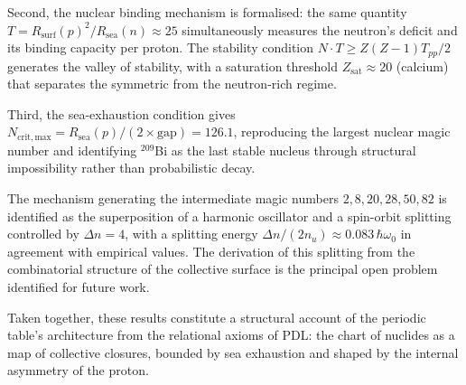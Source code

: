 \documentclass[11pt,a4paper]{article}
\theoremstyle{definition}
\newcommand{\PDL}{\textnormal{PDL}}
\newcommand{\Rsurf}{R_{\mathrm{surf}}}
\newcommand{\Rsea}{R_{\mathrm{sea}}}
\newcommand{\Zsat}{Z_{\mathrm{sat}}}
\newcommand{\Tpp}{T_{pp}}
\begin{document}
Second, the nuclear binding mechanism is formalised: the same quantity $T = \Rsurf(p)^2/\Rsea(n) \approx 25$ simultaneously measures the neutron's deficit and its binding capacity per proton. The stability condition $N \cdot T \geq Z(Z-1)\Tpp/2$ generates the valley of stability, with a saturation threshold $\Zsat \approx 20$ (calcium) that separates the symmetric from the neutron-rich regime.

Third, the sea-exhaustion condition gives $N_{\mathrm{crit,max}} = \Rsea(p)/(2 \times \mathrm{gap}) = 126.1$, reproducing the largest nuclear magic number and identifying ${}^{209}$Bi as the last stable nucleus through structural impossibility rather than probabilistic decay.

The mechanism generating the intermediate magic numbers $2, 8, 20, 28, 50, 82$ is identified as the superposition of a harmonic oscillator and a spin-orbit splitting controlled by $\Delta n = 4$, with a splitting energy $\Delta n/(2n_u) \approx 0.083\,\hbar\omega_0$ in agreement with empirical values. The derivation of this splitting from the combinatorial structure of the collective surface is the principal open problem identified for future work.

Taken together, these results constitute a structural account of the periodic table's architecture from the relational axioms of \PDL: the chart of nuclides as a map of collective closures, bounded by sea exhaustion and shaped by the internal asymmetry of the proton.


\nocite{*}


\end{document}

